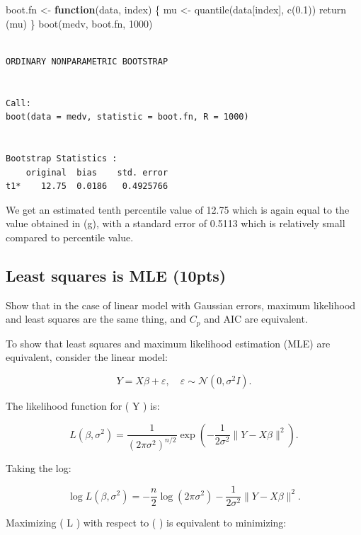 \documentclass[
  letterpaper,
  DIV=11,
  numbers=noendperiod]{scrartcl}
\newenvironment{Shaded}{\begin{snugshade}}{\end{snugshade}}
\newcommand{\ControlFlowTok}[1]{\textcolor[rgb]{0.00,0.23,0.31}{\textbf{#1}}}
\newcommand{\DecValTok}[1]{\textcolor[rgb]{0.68,0.00,0.00}{#1}}
\newcommand{\FloatTok}[1]{\textcolor[rgb]{0.68,0.00,0.00}{#1}}
\newcommand{\FunctionTok}[1]{\textcolor[rgb]{0.28,0.35,0.67}{#1}}
\newcommand{\NormalTok}[1]{\textcolor[rgb]{0.00,0.23,0.31}{#1}}
\newcommand{\OtherTok}[1]{\textcolor[rgb]{0.00,0.23,0.31}{#1}}
\begin{document}
\begin{Shaded}
\begin{Highlighting}[]
\NormalTok{boot.fn }\OtherTok{\textless{}{-}} \ControlFlowTok{function}\NormalTok{(data, index) \{}
\NormalTok{    mu }\OtherTok{\textless{}{-}} \FunctionTok{quantile}\NormalTok{(data[index], }\FunctionTok{c}\NormalTok{(}\FloatTok{0.1}\NormalTok{))}
    \FunctionTok{return}\NormalTok{ (mu)}
\NormalTok{\}}
\FunctionTok{boot}\NormalTok{(medv, boot.fn, }\DecValTok{1000}\NormalTok{)}
\end{Highlighting}
\end{Shaded}

\begin{verbatim}

ORDINARY NONPARAMETRIC BOOTSTRAP


Call:
boot(data = medv, statistic = boot.fn, R = 1000)


Bootstrap Statistics :
    original  bias    std. error
t1*    12.75  0.0186   0.4925766
\end{verbatim}

We get an estimated tenth percentile value of 12.75 which is again equal
to the value obtained in (g), with a standard error of 0.5113 which is
relatively small compared to percentile value.

\subsection{Least squares is MLE
(10pts)}\label{least-squares-is-mle-10pts}

Show that in the case of linear model with Gaussian errors, maximum
likelihood and least squares are the same thing, and \(C_p\) and AIC are
equivalent.

To show that least squares and maximum likelihood estimation (MLE) are
equivalent, consider the linear model:

\[
Y = X\beta + \varepsilon, \quad \varepsilon \sim \mathcal{N}(0, \sigma^2 I).
\]

The likelihood function for ( Y ) is:

\[
L(\beta, \sigma^2) = \frac{1}{(2\pi\sigma^2)^{n/2}} \exp\left( -\frac{1}{2\sigma^2} \| Y - X\beta \|^2 \right).
\]

Taking the log:

\[
\log L(\beta, \sigma^2) = -\frac{n}{2} \log (2\pi\sigma^2) - \frac{1}{2\sigma^2} \| Y - X\beta \|^2.
\]

Maximizing ( L ) with respect to ( \beta ) is equivalent to minimizing:
\end{document}
